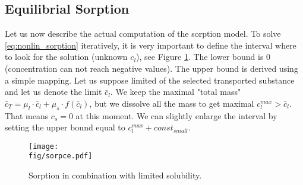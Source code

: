 \subsection{Equilibrial Sorption}

Let us now describe the actual computation of the sorption model.
To solve \eqref{eq:nonlin_sorption} iteratively, it is very important to define the interval where 
to look for the solution (unknown $c_l$), see Figure \ref{fig:sorpce}. The lower bound is $0$ (concentration can not reach negative values). 
The upper bound is derived using a simple mapping. Let us suppose limited 
 of the selected transported substance and let us denote the 
limit $\bar{c}_l$. We keep the maximal "total mass" 
$\bar{c}_T= \mu_l\cdot \bar{c}_l + \mu_s\cdot f(\bar{c}_l)$, but we dissolve all the mass to get 
maximal $c_l^{max} > \bar{c}_l$. That means $c_s = 0$ at this moment. We can slightly enlarge the interval by setting the upper bound equal to 
$c_l^{max} + const_{small}$.

\begin{figure}[ht!]
 \centering
 \texttt{[image: \\fig/sorpce.pdf]}
 \caption{Sorption in combination with limited solubility.}
 \label{fig:sorpce}
\end{figure}


